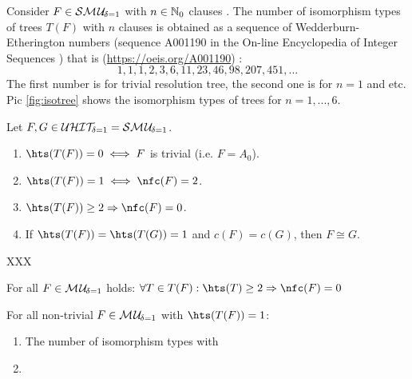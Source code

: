 \documentclass{article}
\begin{document}
\begin{lem}\label{lem:mu1-iso-num}
Consider $F \in \mathcal{S}\mathcal{M\hspace{0.8pt}U}_{\!\delta=1}$ with $n \in \mathbb{N}_0$ clauses . The number of isomorphism types of trees $T(F)$ with $n$ clauses is obtained as a sequence of Wedderburn-Etherington numbers (sequence A001190 in the On-line Encyclopedia of Integer Sequences \cite{Sloane2008OEIS}) that is (\url{https://oeis.org/A001190}) :
\begin{displaymath}
 1, 1, 1, 2, 3, 6, 11, 23, 46, 98, 207, 451, ...
\end{displaymath}
The first number is for trivial resolution tree, the second one is for $n=1$ and etc. Pic \ref{fig:isotree} shows the isomorphism types of trees for $n=1,..., 6$.
\end{lem}   
 
\begin{lem}\label{lem:smu1-full-clause}   
Let $F, G\in \mathcal{U}\mathcal{HIT}_{\!\!\delta=1}=\mathcal{S}\mathcal{M\hspace{0.8pt}U}_{\!\delta=1} $.
  \begin{enumerate}
  \item $\hts(T(F))=0 \iff F$ is trivial (i.e. $F=A_0$).
  \item $ \hts(T(F)) = 1 \iff  \nfc(F)=2$. 
  \item $\hts(T(F)) \ge 2 \Ra \nfc(F)=0$.
  \item If $\hts(T(F))=\hts(T(G))=1$ and $c(F)=c(G)$, then $F \cong G$.
  \end{enumerate} 
\end{lem}
\begin{prf}
XXX
\end{prf}  

\begin{conj}\label{con:mu1-hs-ge2}
For all $F \in \mathcal{M\hspace{0.8pt}U}_{\!\delta=1}$ holds: $\fa T \in T(F) : \hts(T) \ge 2  \Ra \nfc(F)=0$
\end{conj}    

\begin{conj}\label{con:mu1-iso-hs}
For all non-trivial $F \in \mathcal{M\hspace{0.8pt}U}_{\!\delta=1}$ with $\hts(T(F)) = 1$:
  \begin{enumerate}
  \item The number of isomorphism types with 
  \item 
  \end{enumerate}
\end{conj}
\end{document}
